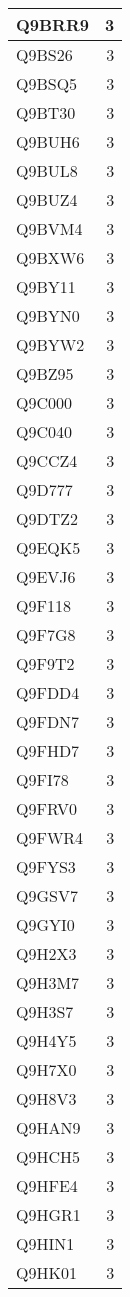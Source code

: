 \documentclass[
]{book}
\theoremstyle{definition}
\theoremstyle{definition}
\theoremstyle{definition}
\theoremstyle{definition}
\theoremstyle{remark}
\begin{document}
\begin{table}
\begin{tabular}{l|r}
\hline
Q9BRR9 & 3\\
\hline
Q9BS26 & 3\\
\hline
Q9BSQ5 & 3\\
\hline
Q9BT30 & 3\\
\hline
Q9BUH6 & 3\\
\hline
Q9BUL8 & 3\\
\hline
Q9BUZ4 & 3\\
\hline
Q9BVM4 & 3\\
\hline
Q9BXW6 & 3\\
\hline
Q9BY11 & 3\\
\hline
Q9BYN0 & 3\\
\hline
Q9BYW2 & 3\\
\hline
Q9BZ95 & 3\\
\hline
Q9C000 & 3\\
\hline
Q9C040 & 3\\
\hline
Q9CCZ4 & 3\\
\hline
Q9D777 & 3\\
\hline
Q9DTZ2 & 3\\
\hline
Q9EQK5 & 3\\
\hline
Q9EVJ6 & 3\\
\hline
Q9F118 & 3\\
\hline
Q9F7G8 & 3\\
\hline
Q9F9T2 & 3\\
\hline
Q9FDD4 & 3\\
\hline
Q9FDN7 & 3\\
\hline
Q9FHD7 & 3\\
\hline
Q9FI78 & 3\\
\hline
Q9FRV0 & 3\\
\hline
Q9FWR4 & 3\\
\hline
Q9FYS3 & 3\\
\hline
Q9GSV7 & 3\\
\hline
Q9GYI0 & 3\\
\hline
Q9H2X3 & 3\\
\hline
Q9H3M7 & 3\\
\hline
Q9H3S7 & 3\\
\hline
Q9H4Y5 & 3\\
\hline
Q9H7X0 & 3\\
\hline
Q9H8V3 & 3\\
\hline
Q9HAN9 & 3\\
\hline
Q9HCH5 & 3\\
\hline
Q9HFE4 & 3\\
\hline
Q9HGR1 & 3\\
\hline
Q9HIN1 & 3\\
\hline
Q9HK01 & 3\\

\end{tabular}
\end{table}
\end{document}
